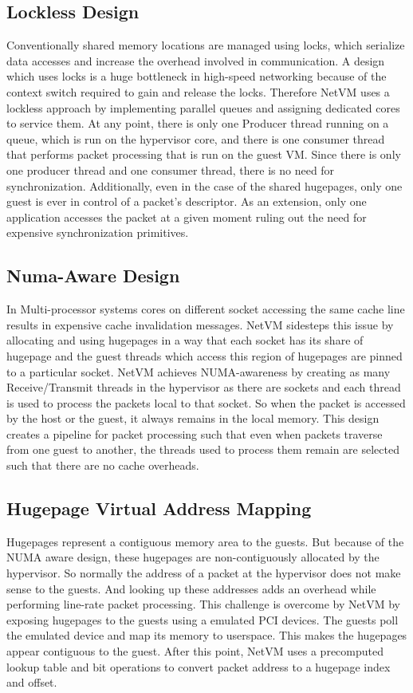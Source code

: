 \subsection*{Lockless Design}
Conventionally shared memory locations are managed using locks, which serialize data accesses and increase the overhead involved in communication. A design which uses locks is a huge bottleneck in high-speed networking because of the context switch required to gain and release the locks. Therefore NetVM uses a lockless approach by implementing parallel queues and assigning dedicated cores to service them. At any point, there is only one Producer thread running on a queue, which is run on the hypervisor core, and there is one consumer thread that performs packet processing that is run on the guest VM. Since there is only one producer thread and one consumer thread, there is no need for synchronization. Additionally, even in the case of the shared hugepages, only one guest is ever in control of a packet's descriptor. As an extension, only one application accesses the packet at a given moment ruling out the need for expensive synchronization primitives.
\subsection*{Numa-Aware Design}
In Multi-processor systems cores on different socket accessing the same cache line results in expensive cache invalidation messages. NetVM sidesteps this issue by allocating and using hugepages in a way that each socket has its share of hugepage and the guest threads which access this region of hugepages are pinned to a particular socket. NetVM achieves NUMA-awareness by creating as many Receive/Transmit threads in the hypervisor as there are sockets and each thread is used to process the packets local to that socket. So when the packet is accessed by the host or the guest, it always remains in the local memory. This design creates a pipeline for packet processing such that even when packets traverse from one guest to another, the threads used to process them remain are selected such that there are no cache overheads.
\subsection*{Hugepage Virtual Address Mapping}
Hugepages represent a contiguous memory area to the guests. But because of the NUMA aware design, these hugepages are non-contiguously allocated by the hypervisor. So normally the address of a packet at the hypervisor does not make sense to the guests. And looking up these addresses adds an overhead while performing line-rate packet processing. This challenge is overcome by NetVM by exposing hugepages to the guests using a emulated PCI devices. The guests poll the emulated device and map its memory to userspace. This makes the hugepages appear contiguous to the guest. After this point, NetVM uses a precomputed lookup table and bit operations to convert packet address to a hugepage index and offset.
